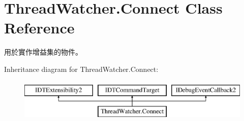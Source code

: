 \hypertarget{class_thread_watcher_1_1_connect}{\section{Thread\+Watcher.\+Connect Class Reference}
\label{class_thread_watcher_1_1_connect}
}


用於實作增益集的物件。 


Inheritance diagram for Thread\+Watcher.\+Connect\+:\begin{figure}[H]
\begin{center}
\leavevmode
\includegraphics[height=2.000000cm]{class_thread_watcher_1_1_connect}
\end{center}
\end{figure}
